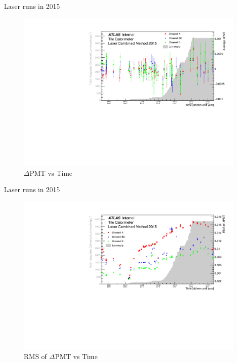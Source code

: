 \documentclass{beamer}
\begin{document}
\begin{frame}{Laser runs in 2015}{}
\begin{figure}
\centering
\includegraphics[width=\textwidth]{pmtm15.pdf}
\caption{$\Delta$PMT vs Time}
\end{figure}
\end{frame}

\begin{frame}{Laser runs in 2015}{}
\begin{figure}
\centering
\includegraphics[width=\textwidth]{pmtr15.pdf}
\caption{RMS of $\Delta$PMT vs Time}
\end{figure}
\end{frame}
\end{document}
